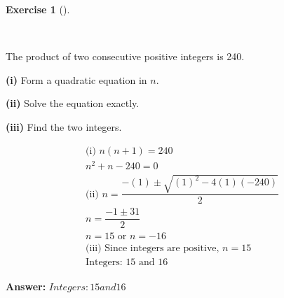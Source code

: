 \documentclass[
  letterpaper,
  DIV=11,
  numbers=noendperiod]{scrreprt}
\theoremstyle{definition}
\newtheorem{exercise}{Exercise}[chapter]
\theoremstyle{remark}
\begin{document}
\begin{exercise}[]\protect\hypertarget{exr-u6-19-1}{}\label{exr-u6-19-1}

~

The product of two consecutive positive integers is 240.

\textbf{(i)} Form a quadratic equation in \(n\).

\textbf{(ii)} Solve the equation exactly.

\textbf{(iii)} Find the two integers.

\begin{tcolorbox}[enhanced jigsaw, opacitybacktitle=0.6, coltitle=black, arc=.35mm, colframe=quarto-callout-tip-color-frame, colback=white, bottomrule=.15mm, left=2mm, colbacktitle=quarto-callout-tip-color!10!white, titlerule=0mm, opacityback=0, title=\textcolor{quarto-callout-tip-color}{\faLightbulb}\hspace{0.5em}{🔍 View Solution}, leftrule=.75mm, breakable, rightrule=.15mm, bottomtitle=1mm, toptitle=1mm, toprule=.15mm]

\begin{align*}
\text{(i) } n(n+1) = 240 \\ n^2 + n - 240 = 0 \\ \text{(ii) } n = \dfrac{-(1) \pm \sqrt{(1)^2 - 4(1)(-240)}}{2} \\ n = \dfrac{-1 \pm 31}{2} \\ n = 15 \text{ or } n = -16 \\ \text{(iii) Since integers are positive, } n = 15 \\ \text{Integers: } 15 \text{ and } 16
\end{align*}

\textbf{Answer:} \(Integers: 15 and 16\)

\end{tcolorbox}

\end{exercise}
\end{document}
